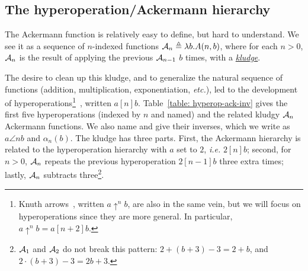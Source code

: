 \subsection{The hyperoperation/Ackermann hierarchy}

The Ackermann function is relatively easy to define, but hard to
understand.  We see it as
a sequence of $n$-indexed functions $\mathcal{A}_n \triangleq \lambda b.A(n,b)$, where for each $n>0$, $\mathcal{A}_n$ is the result of applying the previous $\mathcal{A}_{n-1}$ $b$ times, with a 
\href{https://github.com/inv-ack/inv-ack/blob/7270e64a2600b771f2b1b1b151f7d13fb2ae6c97/repeater.v#L161-L177}{\emph{kludge}}. %

The desire to clean up this kludge, and to generalize the natural sequence
of functions (addition, multiplication, exponentiation, \emph{etc.}),
led to the development of hyperoperations\footnote{Knuth arrows~\cite{knuth}, written $a \uparrow^n b$,
are also in the same vein, but we will focus on hyperoperations
since they are more general. In particular, $a \uparrow^n b = a[n+2]b$.}~\cite{goodstein},
written $a [n] b$.
Table~\ref{table: hyperop-ack-inv} gives the first five hyperoperations
(indexed by $n$ and named) and the related kludgy $\mathcal{A}_n$ Ackermann functions.
We also name and give their inverses,
which we write as $a \angle{n} b$ and $\alpha_n(b)$.
The kludge has three parts. First, the Ackermann hierarchy is related
to the hyperoperation hierarchy with $a$ set to $2$, \emph{i.e.} $2[n]b$;
second, for $n>0$, $\mathcal{A}_n$ repeats the previous hyperoperation $2[n-1]b$
three extra times;
lastly, $\mathcal{A}_n$ subtracts three\footnote{$\mathcal{A}_{1}$ and $\mathcal{A}_{2}$ do not break this pattern: $2 + (b + 3) - 3 = 2 + b$, and $2 \cdot (b + 3) - 3 = 2b + 3$.}.

